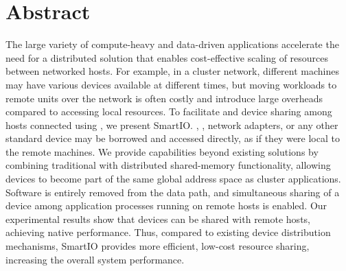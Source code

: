 \chapter{Abstract}

The large variety of compute-heavy and data-driven applications accelerate the need for a distributed  solution that enables cost-effective scaling of resources between networked hosts. 
%
For example, in a cluster network, different machines may have various devices available at different times, but moving workloads to remote units over the network is often costly and introduce large overheads compared to accessing local resources. 
%
To facilitate   and device sharing among hosts connected using  , we present SmartIO.
%
, , network adapters, or any other standard  device may be borrowed and accessed directly, as if they were local to the remote machines. %
%
We provide capabilities beyond existing  solutions by combining traditional  with distributed shared-memory functionality, allowing devices to become part of the same global address space as cluster applications. 
Software is entirely removed from the data path, and simultaneous sharing of a device among application processes running on remote hosts is enabled.
%
Our experimental results show that  devices can be shared with remote hosts, achieving native  performance.
%
Thus, compared to existing device distribution mechanisms, SmartIO provides more efficient, low-cost resource sharing, increasing the overall system performance.


